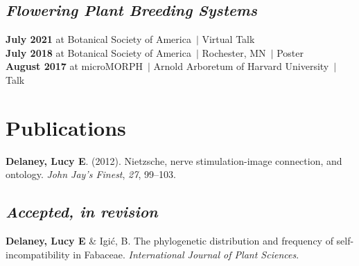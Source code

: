\documentclass[]{article}
\newlength{\cslhangindent}
\newenvironment{cslreferences}
{\setlength{\parindent}{0pt}
\everypar{\setlength{\hangindent}{\cslhangindent}}\ignorespaces}
{\par}
\begin{document}
\subsection{\fontsize{12}{36}\selectfont \textit{Flowering Plant Breeding Systems}}

\textbf{July 2021} at Botanical Society of America\ $\vert$ Virtual Talk \hspace{0.3mm} \href{https://uofi.box.com/v/2021botany-talk}{\faVideo} \href{https://ledelaney.org/talks/2021botany}{\faImages} \href{https://github.com/ledelaney/07-21-Botany}{\faGithub}\\
\textbf{July 2018} at Botanical Society of America\ $\vert$ Rochester, MN\ $\vert$ Poster \hspace{0.4mm} \href{https://ledelaney.org/static/posters/poster.png}{\faFileImage}\\
\textbf{August 2017} at microMORPH\ $\vert$ Arnold Arboretum of Harvard University\ $\vert$ Talk \hspace{0.4mm} \href{https://www.dropbox.com/s/o7hcg5riw97wf9i/08-2017-microMORPH.pdf?dl=1}{\faImages}



\section{\fontsize{16}{48}\selectfont Publications}

\begin{cslreferences}
\textbf{Delaney, Lucy E}. (2012). Nietzsche, nerve stimulation-image connection, and ontology. \emph{John Jay's Finest}, \emph{27}, 99--103. \href{https://ledelaney.org/static/docs/Delaney-JJAYFinest.pdf}{\faFile}\\
\end{cslreferences}

\vspace{-10mm}

\subsection{\fontsize{12}{36}\selectfont \textit{Accepted, in revision}}
\vspace{-2mm}
\begin{cslreferences}
\textbf{Delaney, Lucy E} \& Igić, B. The phylogenetic distribution and frequency of self-incompatibility in Fabaceae. \textit{International Journal of Plant Sciences}.
\end{cslreferences}
\vspace{-4mm}
\end{document}
